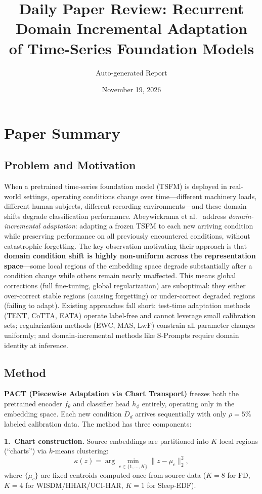 \documentclass[11pt,a4paper]{article}
\title{Daily Paper Review: Recurrent Domain Incremental Adaptation\\of Time-Series Foundation Models}
\author{Auto-generated Report}
\date{November 19, 2026}
\begin{document}
\maketitle

\section{Paper Summary}

\subsection{Problem and Motivation}
When a pretrained time-series foundation model (TSFM) is deployed in real-world settings, operating conditions change over time---different machinery loads, different human subjects, different recording environments---and these domain shifts degrade classification performance. Abeywickrama et al.~\cite{abeywickrama2026pact} address \emph{domain-incremental adaptation}: adapting a frozen TSFM to each new arriving condition while preserving performance on all previously encountered conditions, without catastrophic forgetting. The key observation motivating their approach is that \textbf{domain condition shift is highly non-uniform across the representation space}---some local regions of the embedding space degrade substantially after a condition change while others remain nearly unaffected. This means global corrections (full fine-tuning, global regularization) are suboptimal: they either over-correct stable regions (causing forgetting) or under-correct degraded regions (failing to adapt). Existing approaches fall short: test-time adaptation methods (TENT, CoTTA, EATA) operate label-free and cannot leverage small calibration sets; regularization methods (EWC, MAS, LwF) constrain all parameter changes uniformly; and domain-incremental methods like S-Prompts require domain identity at inference.

\subsection{Method}
\textbf{PACT (Piecewise Adaptation via Chart Transport)} freezes both the pretrained encoder $f_\theta$ and classifier head $h_\phi$ entirely, operating only in the embedding space. Each new condition $D_d$ arrives sequentially with only $\rho{=}5\%$ labeled calibration data. The method has three components:

\textbf{1.~Chart construction.} Source embeddings are partitioned into $K$ local regions (``charts'') via $k$-means clustering:
\[
  \kappa(z) = \arg\min_{c \in \{1,\ldots,K\}} \|z - \mu_c\|_2^2,
\]
where $\{\mu_c\}$ are fixed centroids computed once from source data ($K{=}8$ for FD, $K{=}4$ for WISDM/HHAR/UCI-HAR, $K{=}1$ for Sleep-EDF).
\end{document}
